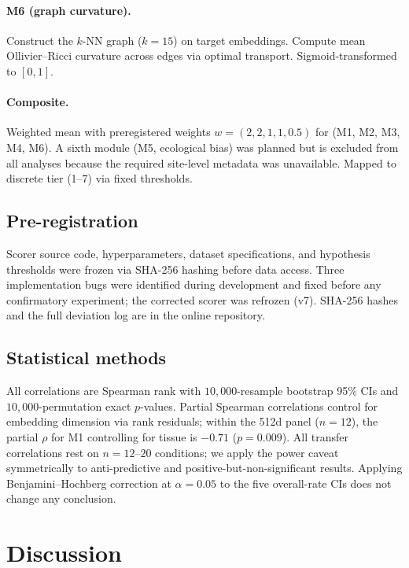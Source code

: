 \documentclass[11pt]{article}
\begin{document}
\paragraph{M6 (graph curvature).} Construct the $k$-NN graph ($k = 15$) on target embeddings. Compute mean Ollivier--Ricci curvature across edges via optimal transport. Sigmoid-transformed to $[0, 1]$.

\paragraph{Composite.} Weighted mean with preregistered weights $w = (2, 2, 1, 1, 0.5)$ for (M1, M2, M3, M4, M6). A sixth module (M5, ecological bias) was planned but is excluded from all analyses because the required site-level metadata was unavailable. Mapped to discrete tier (1--7) via fixed thresholds.

\subsection{Pre-registration}

Scorer source code, hyperparameters, dataset specifications, and hypothesis thresholds were frozen via SHA-256 hashing before data access. Three implementation bugs were identified during development and fixed before any confirmatory experiment; the corrected scorer was refrozen (v7). SHA-256 hashes and the full deviation log are in the online repository.

\subsection{Statistical methods}

All correlations are Spearman rank with $10{,}000$-resample bootstrap 95\% CIs and $10{,}000$-permutation exact $p$-values. Partial Spearman correlations control for embedding dimension via rank residuals; within the 512d panel ($n = 12$), the partial $\rho$ for M1 controlling for tissue is $-0.71$ ($p = 0.009$). All transfer correlations rest on $n = 12$--$20$ conditions; we apply the power caveat symmetrically to anti-predictive and positive-but-non-significant results. Applying Benjamini--Hochberg correction at $\alpha = 0.05$ to the five overall-rate CIs does not change any conclusion.


\section{Discussion}
\label{sec:discussion}
\end{document}
